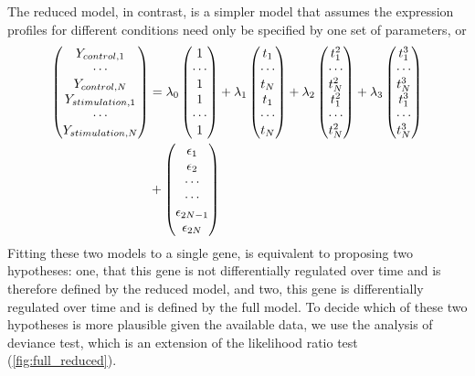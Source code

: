 The reduced model, in contrast, is a simpler model that assumes the expression
profiles for different conditions need only be specified by one set of 
parameters, or 
\begin{align}
\begin{pmatrix}
Y_{control,1}\\
\cdots\\
Y_{control,N}\\
Y_{stimulation,1}\\
\cdots\\
Y_{stimulation,N}
\end{pmatrix}
%
&= \lambda_0 
\begin{pmatrix}
1\\
\cdots\\
1\\
1\\
\cdots\\
1
\end{pmatrix}
%
+ \lambda_1 
\begin{pmatrix}
t_1\\
\cdots\\
t_N\\
t_1\\
\cdots\\
t_N
\end{pmatrix}
%
+ \lambda_2 
\begin{pmatrix}
t_1^2\\
\cdots\\
t_N^2\\
t_1^2\\
\cdots\\
t_N^2
\end{pmatrix}
%
+ \lambda_3
\begin{pmatrix}
t_1^3\\
\cdots\\
t_N^3\\
t_1^3\\
\cdots\\
t_N^3
\end{pmatrix}\notag \\
%
&+ 
\begin{pmatrix}
\epsilon_1\\
\epsilon_2\\
\cdots\\
\cdots\\
\epsilon_{2N-1}\\
\epsilon_{2N}
\end{pmatrix}
\end{align}
Fitting these two models to a single gene, is equivalent to
proposing two hypotheses: one, that this gene is not differentially regulated 
over time and is therefore defined by the reduced model, and two, this gene is 
differentially regulated over time and is defined by the full model. To decide 
which of these two hypotheses is more plausible given the available data, we 
use the analysis of deviance test, which is an extension of the likelihood 
ratio test (\ref{fig:full_reduced}).

